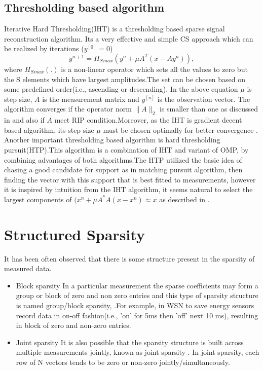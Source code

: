 \subsection{Thresholding based algorithm}
Iterative Hard Thresholding(IHT) is a thresholding based sparse signal reconstruction algorithm. Its a very effective and simple CS approach which can be realized by iterations ($y^{[0]}=0$)
\begin{equation}
    y^{n+1}=H_S{_{max}}(y^{n} + \mu A^T(x-Ay^{n})),
\end{equation}
where $H_S{_{max}}(.)$ is a non-linear operator which sets all the values to zero but the S elements which have largest amplitudes.The set can be  chosen based on some predefined order(i.e., ascending or descending). In the above equation $\mu$ is step size, $A$ is the measurement matrix and $y^{[n]}$ is the observation vector.
The algorithm converges if the operator norm $\|A\|_2$ is smaller than one as discussed in \cite{IHT09} and also if $A$ meet RIP condition.Moreover, as the IHT is gradient decent based algorithm, its step size $\mu$ must be chosen optimally for better convergence \cite{Aiht}.\\
Another important thresholding based algorithm is hard thresholding pursuit(HTP).This algorithm is a combination of IHT and variant of OMP, by combining advantages of both algorithms.The HTP utilized the basic idea of chasing a good candidate for support as in matching pursuit algorithm, then finding the vector with this support that is best fitted to measurements, however it is  inspired by intuition from the IHT algorithm, it seems natural to select the largest components of $(x^n + \mu A^*A(x-x^n)  \approx x$ as described in \cite{HTP11}.
\section{Structured Sparsity}
It has been often observed that there is some structure present in the sparsity of measured data.
\begin{itemize}
\item Block sparsity
 In a particular measurement the sparse coefficients may form a group or block of zero and non zero entries and this type of sparsity structure is named group/block sparsity, \cite{beamblock,our_intrabody,Dekorsy12}.For example, in WSN to save energy sensors record data in on-off fashion(i.e., 'on' for 5ms then 'off' next 10 ms), resulting in block of zero and non-zero entries.
\item Joint sparsity
It is also possible that the sparsity structure is built across multiple measurements jointly, known as  joint sparsity \cite{mainref-joint,mainref-1bit,antenna_spacing_sparse}. In joint sparsity, each row of N vectors tends to be zero or non-zero jointly/simultaneously.
\end{itemize}

